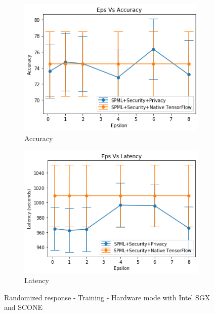 \begin{figure}
\begin{subfigure}{0.5\textwidth}
         \includegraphics[width=\textwidth]{images/RR/hwAccuracy.png}
         \caption{Accuracy}
         \label{fig:hwRRAccuracyInference}
     \end{subfigure}
     \begin{subfigure}{0.5\textwidth}
         \includegraphics[width=\textwidth]{images/RR/hwLatency.png}
         \caption{Latency}
         \label{fig:hwRRLatencyInference}
     \end{subfigure}
        \caption{Randomized response - Training - Hardware mode with Intel SGX and SCONE}
\end{figure}





